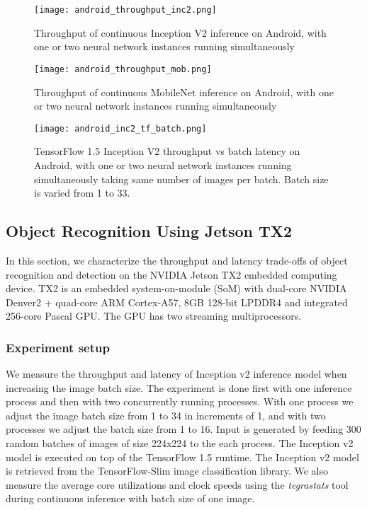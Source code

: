 \documentclass[sigconf]{acmart}
\begin{document}
\begin{figure}[t]
\centering
\texttt{[image: android\_throughput\_inc2.png]}
\caption{Throughput of continuous Inception V2 inference on Android, with one or two neural network instances running simultaneously}
\label{fig:android_throughput_inc2}
\end{figure}\begin{figure}[t]
\centering
\texttt{[image: android\_throughput\_mob.png]}
\caption{Throughput of continuous MobileNet inference on Android, with one or two neural network instances running simultaneously}
\label{fig:android_throughput_mob}
\end{figure}\begin{figure}[t]
\centering
\texttt{[image: android\_inc2\_tf\_batch.png]}
\caption{TensorFlow 1.5 Inception V2 throughput vs batch latency on Android, with one or two neural network instances running simultaneously taking same number of images per batch. Batch size is varied from 1 to 33.}
\label{fig:android_inc2_tf_batch}
\end{figure}\subsection{Object Recognition Using Jetson TX2}\label{sec:jetson_recognition}

In this section, we characterize the throughput and latency trade-offs of object recognition and detection on the NVIDIA Jetson TX2 embedded computing device. TX2 is an embedded system-on-module (SoM) with dual-core NVIDIA Denver2 + quad-core ARM Cortex-A57, 8GB 128-bit LPDDR4 and integrated 256-core Pascal GPU. The GPU has two streaming multiprocessors.

\subsubsection{Experiment setup}

We measure the throughput and latency of Inception v2 inference model when increasing the image batch size. The experiment is done first with one inference process and then with two concurrently running processes. With one process we adjust the image batch size from 1 to 34 in increments of 1, and with two processes we adjust the batch size from 1 to 16. Input is generated by feeding 300 random batches of images of size 224x224 to the each process. The Inception v2 model is executed on top of the TensorFlow 1.5 runtime. The Inception v2 model is retrieved from the TensorFlow-Slim image classification library.
We also measure the average core utilizations and clock speeds using the \textit{tegrastats} tool during continuous inference with batch size of one image.
\end{document}
